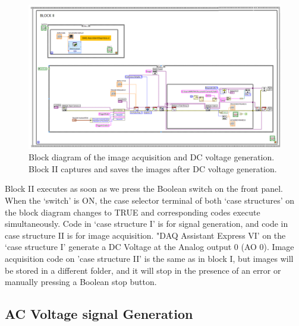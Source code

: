 \documentclass[journal=jacsat,manuscript=article]{achemso}
\begin{document}
\begin{figure}[H]
    \centering
    \includegraphics[width=1.3\linewidth,angle=90]{Block2.png}
    \caption{Block diagram of the image acquisition and DC voltage generation. Block II captures and saves the images after DC voltage generation.}
    \label{fig:ex5}
\end{figure}
Block II executes as soon as we press the Boolean switch on the front panel. When the ‘switch’ is ON, the case selector terminal of both ‘case structures’ on the block diagram changes to TRUE and corresponding codes execute simultaneously. Code in ‘case structure I’ is for signal generation, and code in case structure II is for image acquisition. "DAQ Assistant Express VI' on the ‘case structure I’ generate a DC Voltage at the Analog output 0 (AO 0). Image acquisition code on 'case structure II' is the same as in block I, but images will be stored in a different folder, and it will stop in the presence of an error or manually pressing a Boolean stop button.
\subsection{AC Voltage signal Generation}
\end{document}
